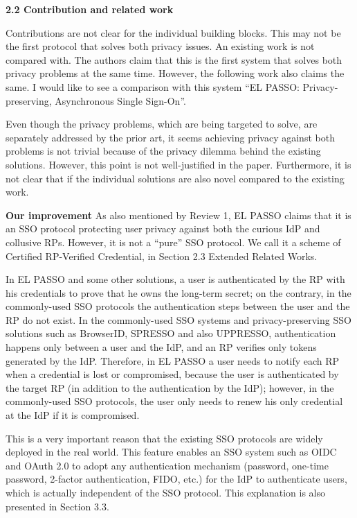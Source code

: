 \documentclass[letterpaper,onecolumn,10pt]{article}
\begin{document}
\vspace{1mm}\noindent\textbf{2.2 Contribution and related work}

Contributions are not clear for the individual building blocks.
This may not be the first protocol that solves both privacy issues. An existing work is not compared with.
The authors claim that this is the first system that solves both privacy problems at the same time. However, the following work also claims the same. I would like to see a comparison with this system ``EL PASSO: Privacy-preserving, Asynchronous Single Sign-On''.

Even though the privacy problems, which are being targeted to solve, are separately addressed by the prior art,
 it seems achieving privacy against both problems is not trivial because of the privacy dilemma behind the existing solutions.
However, this point is not well-justified in the paper.
Furthermore, it is not clear that if the individual solutions are also novel compared to the existing work.

\vspace{1mm}\noindent\textbf{Our improvement}
As also mentioned by Review 1, EL PASSO claims that it is an SSO protocol protecting user privacy against both the curious IdP and collusive RPs.
However, it is not a ``pure'' SSO protocol. We call it a scheme of Certified RP-Verified Credential, in Section 2.3 Extended Related Works.

In EL PASSO and some other solutions,
    a user is authenticated by the RP with his credentials
            to prove that he owns the long-term secret;
            on the contrary,
 in the commonly-used SSO protocols    the authentication steps between the user and the RP do not exist.
In the commonly-used SSO systems and privacy-preserving SSO solutions
    such as BrowserID, SPRESSO and also UPPRESSO,
    authentication happens only between a user and the IdP,
    and an RP verifies only tokens generated by the IdP.
Therefore,
         in EL PASSO a user needs to notify each RP when a credential is lost or compromised,
    because the user is authenticated by the target RP (in addition to the authentication by the IdP);
however, in the commonly-used SSO protocols, the user only needs to renew his only credential at the IdP if it is compromised.

This is a very important reason that the existing SSO protocols are widely deployed in the real world.
This feature enables an SSO system such as OIDC and OAuth 2.0 to adopt any authentication mechanism
 (password, one-time password, 2-factor authentication, FIDO, etc.) for the IdP to authenticate users,
  which is actually independent of the SSO protocol.
This explanation is also presented in Section 3.3.
\end{document}
